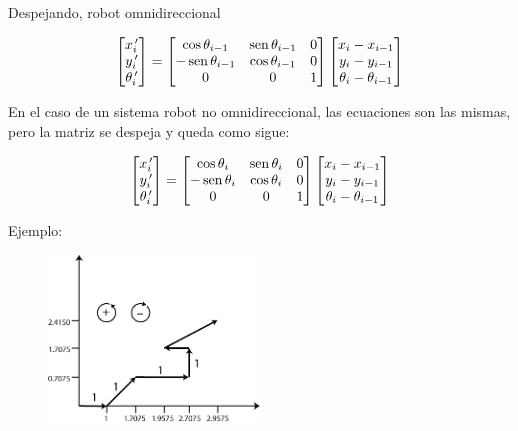 Despejando, robot omnidireccional

$$
\begin{bmatrix}
x_{i}^{\,\prime} \\
y_{i}^{\, \prime} \\
\theta_{i}^{\, \prime}
\end{bmatrix} = \begin{bmatrix}
\cos \theta_{i - 1} & \mathop{\rm sen}\nolimits \theta_{i - 1} & 0 \\
-\mathop{\rm sen}\nolimits \theta_{i - 1} & \cos \theta_{i - 1} & 0 \\
0                     &                0      & 1
\end{bmatrix} \begin{bmatrix}
x_{i} - x_{i - 1} \\
y_{i} - y_{i - 1}\\
\theta_{i} - \theta_{i - 1}
\end{bmatrix} 
$$

En el caso de un sistema robot no omnidireccional, las ecuaciones son las mismas, pero la matriz se despeja y queda como sigue:

$$
\begin{bmatrix}
x_{i}^{\,\prime} \\
y_{i}^{\, \prime} \\
\theta_{i}^{\, \prime}
\end{bmatrix} = \begin{bmatrix}
\cos \theta_{i} & \mathop{\rm sen}\nolimits \theta_{i} & 0 \\
- \mathop{\rm sen}\nolimits \theta_{i} & \cos \theta_{i} & 0 \\
0                     &                0      & 1
\end{bmatrix} \begin{bmatrix}
x_{i} - x_{i - 1} \\
y_{i} - y_{i - 1}\\
\theta_{i} - \theta_{i - 1}
\end{bmatrix} 
$$ 

Ejemplo:

\begin{figure}[h!]
	\centering
	\includegraphics[width=0.5\textwidth]{images/img20.png}
	\label{figura20}
\end{figure}

